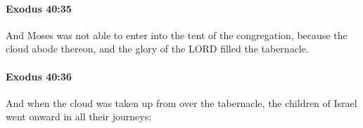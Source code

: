 		\paragraph{Exodus 40:35} %
			\label{EXODUS-40-35}

			And Moses was not able to enter into the tent of the congregation, because the cloud abode thereon, and the glory of the LORD filled the tabernacle.


		\paragraph{Exodus 40:36} %
			\label{EXODUS-40-36}

			And when the cloud was taken up from over the tabernacle, the children of Israel went onward in all their journeys:


